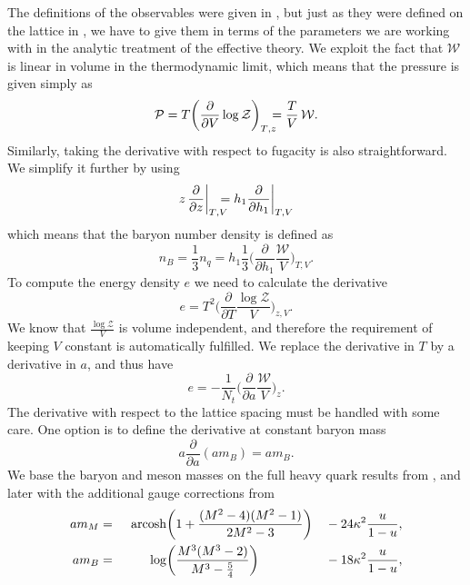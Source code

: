 The definitions of the observables were given in , but
just as they were defined on the lattice in ,
we have to give them in terms of the parameters we are working with in the
analytic treatment of the effective theory. We exploit
the fact that  $\mathcal{W}$ is linear in volume in the thermodynamic limit,
which means that the pressure is given simply as
%
\begin{equation}
  \mathcal{P} = T \bigg( \frac{\partial}{\partial V} \log \mathcal{Z}
  \bigg)_{T\mathrlap{,z}} = \frac{T}{V}\,\mathcal{W}.
\end{equation}
%
Similarly, taking the derivative with respect to fugacity is also
straightforward. We simplify it further by using
%
\begin{equation}
  z\, \frac{\partial}{\partial z} \bigg|_{T\mathrlap{,V}} = h_1
  \frac{\partial}{\partial h_1} \bigg|_{T,V}
\end{equation}
%
which means that the baryon number density is defined as
%
\begin{equation}
  n_B = \frac{1}{3} n_q = h_1 \frac{1}{3} \bigg( \frac{\partial}{\partial h_1} \frac{\mathcal{W}}{V} \bigg)_{T,V}.
\end{equation}
%
To compute the energy density $e$ we need to calculate the
derivative
%
\begin{equation}
  e = T^2 \bigg( \frac{\partial}{\partial T} \frac{\log \mathcal{Z}}{V}
    \bigg)_{z,V}.
\end{equation}
%
We know that $\frac{\log \mathcal{Z}}{V}$ is volume independent, and therefore
the requirement of keeping $V$ constant is automatically fulfilled. We replace
the derivative in $T$ by a derivative in $a$, and thus have
%
\begin{equation}
  e = -\frac{1}{N_t} \bigg( \frac{\partial}{\partial a} \frac{\mathcal{W}}{V}
    \bigg)_z.
\end{equation}
%
The derivative with respect to the lattice spacing must be handled with some
care. One option is to define the derivative at constant baryon mass
%
\begin{equation}
  a \frac{\partial}{\partial a} (a m_B) = a m_B.
\end{equation}
%
We base the baryon and meson masses on the full heavy quark results from
\citep{Smit:2002introduction}, and later with the additional gauge corrections
from \citep{Langelage:2014vpa}
%
\begin{alignat}{99}
  a m_M &{}={}& \,\acosh &\bigg(1 + \frac{(M^2 - 4)(M^2 - 1)}{2M^2 - 3}\bigg) &&- 24 \kappa^2 \frac{u}{1-u},\\
  a m_B &{}={}& \log &\bigg(\frac{M^3(M^3 - 2)}{M^3 - \frac{5}{4}}\bigg) &&- 18
  \kappa^2 \frac{u}{1-u},
\end{alignat}
